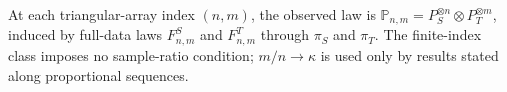 At each triangular-array index \((n,m)\), the observed law is \(\mathbb P_{n,m}=P_S^{\otimes n}\otimes P_T^{\otimes m}\), induced by full-data laws \(F^S_{n,m}\) and \(F^T_{n,m}\) through \(\pi_S\) and \(\pi_T\). The finite-index class imposes no sample-ratio condition; \(m/n\to\kappa\) is used only by results stated along proportional sequences.